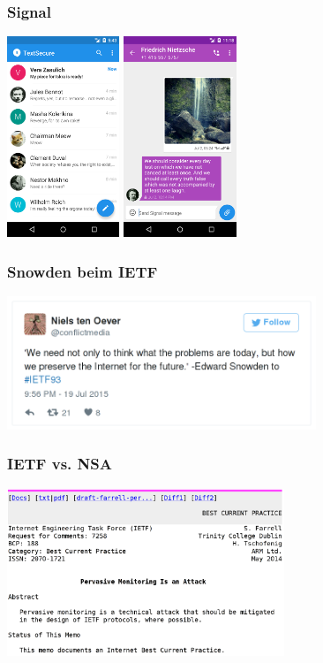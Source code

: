 \documentclass[12pt, xcolor={svgnames,table}]{beamer}
\begin{document}
\begin{frame}
  \frametitle{Signal}
    \begin{center}
      \includegraphics[height=6cm]{img/signal1.png}
      \hspace{0.5cm}
      \includegraphics[height=6cm]{img/signal2.png}
    \end{center}
\end{frame}

\begin{frame}
  \frametitle{Snowden beim IETF}
    \begin{center}
      \includegraphics[height=4cm]{img/snowden-ietf.png}
    \end{center}
\end{frame}

\begin{frame}
  \frametitle{IETF vs. NSA}
    \begin{center}
      \includegraphics[height=5cm]{img/ietf-nsa.png}
    \end{center}
\end{frame}
\end{document}
